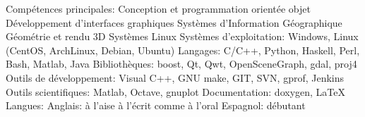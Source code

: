 \begin{cvskills}
  \cvskill
    {Compétences principales:}
 	{
		Conception et programmation orientée objet \newline
 	 	Développement d'interfaces graphiques \newline
 	 	Systèmes d'Information Géographique \newline
	 	Géométrie et rendu 3D \newline
	 	Systèmes Linux
	}
  \cvskill
    {Systèmes d'exploitation:}
 	{Windows, Linux (CentOS, ArchLinux, Debian, Ubuntu)}
  \cvskill
    {Langages:}
 	{C/C++, Python, Haskell, Perl, Bash, Matlab, Java}
  \cvskill
    {Bibliothèques:}
 	{boost, Qt, Qwt, OpenSceneGraph, gdal, proj4}
  \cvskill
	{Outils de développement:}
	{Visual C++, GNU make, GIT, SVN, gprof, Jenkins}
  \cvskill
	{Outils scientifiques:}
	{Matlab, Octave, gnuplot}
  \cvskill
	{Documentation:}
	{doxygen, \LaTeX}
  \cvskill
    {Langues:}
 	{
		Anglais: à l'aise à l'écrit comme à l'oral \newline
		Espagnol: débutant
	}
\end{cvskills}


